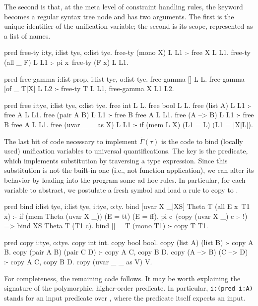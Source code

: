 \documentclass[a4paper, 11pt]{book}
\begin{document}
The second is that, at the meta level of constraint handling rules, the
 keyword becomes a regular syntax tree node and has two arguments.
The first is the unique identifier of the unification variable; the second is
its scope, represented as a list of names.

\begin{elpicode}
pred free-ty i:ty, i:list tye, o:list tye.
free-ty (mono X) L L1 :- free X L L1.
free-ty (all _ F) L L1 :- pi x\ free-ty (F x) L L1.

pred free-gamma i:list prop, i:list tye, o:list tye.
free-gamma [] L L.
free-gamma [of _ T|X] L L2 :- free-ty T L L1, free-gamma X L1 L2.

pred free i:tye, i:list tye, o:list tye.
free int L L.
free bool L L.
free (list A) L L1 :- free A L L1.
free (pair A B) L L1 :- free B {free A L} L1.
free (A --> B) L L1 :- free B {free A L} L1.
free (uvar _ _ as X) L L1 :- if (mem L X) (L1 = L) (L1 = [X|L]).
\end{elpicode}

\noindent
The last bit of code necessary to implement $\overline{\Gamma}(\tau)$ is the
code to bind (locally used) unification variables to universal
quantifications. The key is the  predicate, which implements
substitution by traversing a type expression. Since this substitution is not
the built-in one (i.e., not function application), we can alter its behavior
by loading into the program some ad hoc rules. In particular, for
each variable  to abstract, we postulate a fresh symbol
 and load a rule to copy  to .

\begin{elpicode}
pred bind i:list tye, i:list tye, i:tye, o:ty.
bind [uvar X _|XS] Theta T (all E x\ T1 x) :- %
  if (mem Theta (uvar X _)) (E = tt) (E = ff),
  pi c\ (copy (uvar X _) c :- !) => bind XS Theta T (T1 c).
bind [] _ T (mono T1) :- copy T T1. %

pred copy i:tye, o:tye.
copy int int.
copy bool bool.
copy (list A) (list B) :- copy A B.
copy (pair A B) (pair C D) :- copy A C, copy B D.
copy (A --> B) (C --> D) :- copy A C, copy B D.
copy (uvar _ _ as V) V.
\end{elpicode}

\noindent
For completeness, the remaining code follows. It may be worth explaining the
signature of the polymorphic, higher-order  predicate. In
particular, \texttt{i:(pred i:A)} stands for an input predicate over
, where the predicate itself expects an input.
\end{document}
